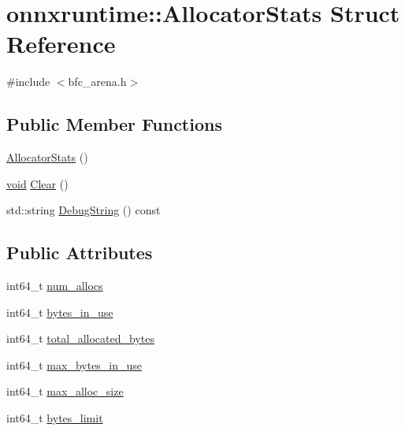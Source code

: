 \hypertarget{structonnxruntime_1_1AllocatorStats}{}\section{onnxruntime\+:\+:Allocator\+Stats Struct Reference}
\label{structonnxruntime_1_1AllocatorStats}


{\ttfamily \#include $<$bfc\+\_\+arena.\+h$>$}

\subsection*{Public Member Functions}
\begin{DoxyCompactItemize}
\item 
\mbox{\hyperlink{structonnxruntime_1_1AllocatorStats_a1f3007a59cce2ab272a0e543c56174bd}{Allocator\+Stats}} ()
\item 
\mbox{\hyperlink{mlasi_8h_a88f941d423cb2a819b70a1358982b1a6}{void}} \mbox{\hyperlink{structonnxruntime_1_1AllocatorStats_a16bb7f91942c242ebcb47929b2d3611e}{Clear}} ()
\item 
std\+::string \mbox{\hyperlink{structonnxruntime_1_1AllocatorStats_aec0ad1d37188d81b697cbbf37ba0fb60}{Debug\+String}} () const
\end{DoxyCompactItemize}
\subsection*{Public Attributes}
\begin{DoxyCompactItemize}
\item 
int64\+\_\+t \mbox{\hyperlink{structonnxruntime_1_1AllocatorStats_ab2c8bfc4ebd943ae62de95be58c9511a}{num\+\_\+allocs}}
\item 
int64\+\_\+t \mbox{\hyperlink{structonnxruntime_1_1AllocatorStats_a185a8a0202f5b6b0bda751e12f957e34}{bytes\+\_\+in\+\_\+use}}
\item 
int64\+\_\+t \mbox{\hyperlink{structonnxruntime_1_1AllocatorStats_ae03dcccf7970dfdd246a13028efdaffc}{total\+\_\+allocated\+\_\+bytes}}
\item 
int64\+\_\+t \mbox{\hyperlink{structonnxruntime_1_1AllocatorStats_ab9f11af20927985be31141621911114e}{max\+\_\+bytes\+\_\+in\+\_\+use}}
\item 
int64\+\_\+t \mbox{\hyperlink{structonnxruntime_1_1AllocatorStats_af75c972046d4652022b4bffdb0ba1599}{max\+\_\+alloc\+\_\+size}}
\item 
int64\+\_\+t \mbox{\hyperlink{structonnxruntime_1_1AllocatorStats_a9bcf01c3227c2f8396acc5ee377a123d}{bytes\+\_\+limit}}
\end{DoxyCompactItemize}


